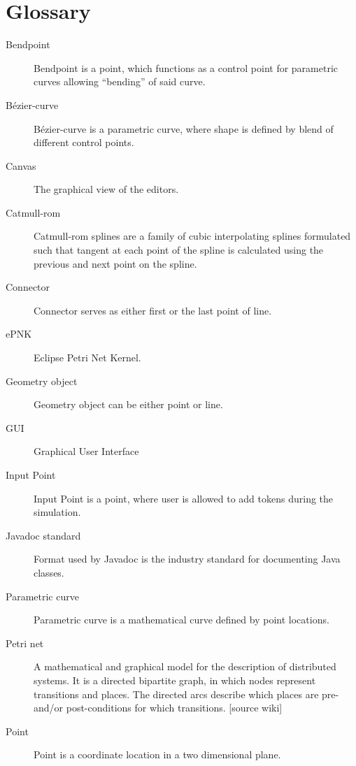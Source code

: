 \section{Glossary}
\begin{description}

\item [Bendpoint] Bendpoint is a point, which functions as a control point for parametric curves allowing “bending” of said curve.

\item [Bézier-curve] Bézier-curve is a parametric curve, where shape is defined by blend of different control points.

\item [Canvas] The graphical view of the editors.

\item [Catmull-rom] Catmull-rom splines are a family of cubic interpolating splines formulated such that tangent at each point of the spline is calculated using the previous and next point on the spline. 

\item [Connector]  Connector serves as either first or the last point of line.

\item [ePNK] Eclipse Petri Net Kernel.

\item [Geometry object] Geometry object can be either point or line.

\item [GUI] Graphical User Interface

\item [Input Point] Input Point is a point, where user is allowed to add tokens during the simulation.

\item [Javadoc standard] Format used by Javadoc is the industry standard for documenting Java classes.

\item [Parametric curve] Parametric curve is a mathematical curve defined by point locations.

\item [Petri net] A mathematical and graphical model for the description of distributed systems. It is a directed bipartite graph, in which nodes represent transitions and places. The directed arcs describe which places are pre- and/or post-conditions for which transitions. [source wiki]

\item [Point] Point is a coordinate location in a two dimensional plane.


\end{description}
